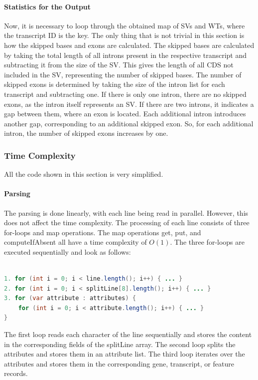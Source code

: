 \documentclass{article}
\begin{document}
    \paragraph{Statistics for the Output}
    Now, it is necessary to loop through the obtained map of SVs and WTs, where the transcript ID is the key.
    The only thing that is not trivial in this section is how the skipped bases and exons are calculated. The skipped bases are calculated by taking the total length of all introns present in the respective transcript and subtracting it from the size of the SV. This gives the length of all CDS not included in the SV, representing the number of skipped bases.
    The number of skipped exons is determined by taking the size of the intron list for each transcript and subtracting one. If there is only one intron, there are no skipped exons, as the intron itself represents an SV. If there are two introns, it indicates a gap between them, where an exon is located. Each additional intron introduces another gap, corresponding to an additional skipped exon. So, for each additional intron, the number of skipped exons increases by one.

    \subsubsection{Time Complexity}
    All the code shown in this section is very simplified.

    \paragraph{Parsing}
    The parsing is done linearly, with each line being read in parallel. However, this does not affect the time complexity. The processing of each line consists of three for-loops and map operations. The map operations get, put, and computeIfAbsent all have a time complexity of $O(1)$. The three for-loops are executed sequentially and look as follows:

    \begin{lstlisting}[language=Java]

1. for (int i = 0; i < line.length(); i++) { ... }
2. for (int i = 0; i < splitLine[8].length(); i++) { ... }
3. for (var attribute : attributes) { 
    for (int i = 0; i < attribute.length(); i++) { ... } 
}

    \end{lstlisting}
    The first loop reads each character of the line sequentially and stores the content in the corresponding fields of the splitLine array. The second loop splits the attributes and stores them in an attribute list. The third loop iterates over the attributes and stores them in the corresponding gene, transcript, or feature records.
\end{document}
